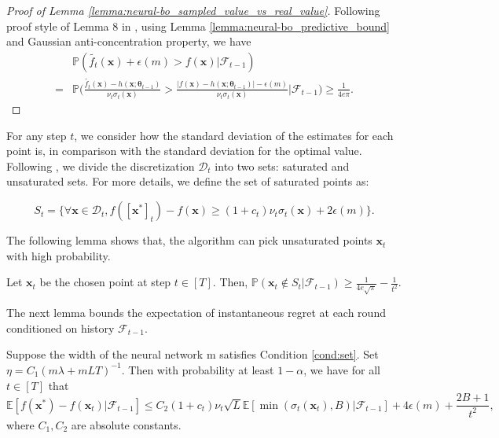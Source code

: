 \begin{proof}[Proof of Lemma \ref{lemma:neural-bo_sampled_value_vs_real_value}]
Following proof style of Lemma 8 in \citet{zhou2020neural}, using Lemma \ref{lemma:neural-bo_predictive_bound} and Gaussian anti-concentration property, we have 
\begin{align*}
        & \mathbb{P}(\widetilde{f_t}(\mathbf{x}) + \epsilon(m) > f(\mathbf{x}) \lvert \mathcal{F}_{t-1}) \\
        = & \mathbb{P} \Bigg(\frac{\widetilde{f_t}(\mathbf{x}) - h(\mathbf{x}; \boldsymbol{\theta}_{t-1}) }{\nu_t \sigma_t(\mathbf{x})} >   \frac{ \lvert f(\mathbf{x}) - h(\mathbf{x}; \boldsymbol{\theta}_{t-1}) \rvert - \epsilon(m) }{\nu_t \sigma_t(\mathbf{x})}  \Bigg \lvert \mathcal{F}_{t-1} \Bigg) \geq \frac{1}{4e\pi}.
\end{align*}
\end{proof}

\noindent For any step $t$, we consider how the standard deviation of the estimates for each point is, in comparison with the standard deviation for the optimal value.
Following \citet{zhang2021neural}, we divide the discretization $\mathcal D_t$ into two sets: saturated and unsaturated sets. For more details, we define the set of saturated points as:

\begin{equation*}
\label{def:neural-bo_saturated_set}
S_t = \{\forall \mathbf{x} \in \mathcal{D}_t, f([\mathbf{x}^*]_t) - f(\mathbf{x}) \geq (1+c_t)\nu_t \sigma_t(\mathbf{x})+ 2\epsilon(m)\}.
\end{equation*}


The following lemma shows that, the algorithm can pick unsaturated points $\mathbf{x}_t$ with high probability. 
\begin{lemma}
\label{lemma:neural-bo_unsaturated_points}

Let $\mathbf{x}_t$ be the chosen point at step $t \in [T]$. Then, $\mathbb{P}(\mathbf{x}_t \not\in S_t \lvert \mathcal{F}_{t-1}) \geq \frac{1}{4e\sqrt{\pi}} - \frac{1}{t^2}$.
\end{lemma}

The next lemma bounds the expectation of instantaneous regret at each round conditioned on history $\mathcal{F}_{t-1}$.

\begin{lemma}
\label{lemma:neural-bo_regret_expectation}
Suppose the width of the neural network m satisfies Condition \ref{cond:set}. Set $\eta = C_1(m\lambda + mLT)^{-1}$. Then with probability at least $1- \alpha$, we have for all $t \in [T]$ that
\begin{equation*}
\mathbb{E}[f(\mathbf{x}^*) - f(\mathbf{x}_t) \lvert \mathcal{F}_{t-1}] \leq C_2 (1+c_t)\nu_t \sqrt{L} \mathbb{E}[ \min(\sigma_t(\mathbf{x}_t),B)\lvert\mathcal{F}_{t-1}] + 4\epsilon(m) + \frac{2B+1}{t^2},
\end{equation*}
where $C_1, C_2$ are absolute constants.
\end{lemma}

